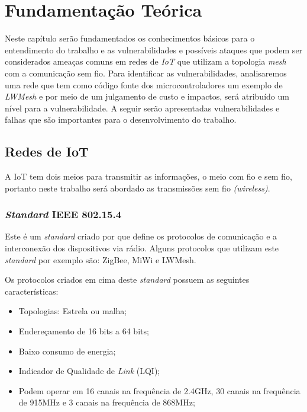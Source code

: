 \chapter{Fundamentação Teórica}
\label{ch:fundamentacao}
\par Neste capítulo serão fundamentados os conhecimentos b\'asicos para o entendimento do trabalho e as vulnerabilidades e possíveis ataques que podem ser considerados ameaças comuns em redes de \emph{IoT} que utilizam a topologia \emph{mesh} com a comunica\c{c}\~ao sem fio. Para identificar as vulnerabilidades, analisaremos uma rede que tem como c\'odigo fonte dos microcontroladores um exemplo de \emph{LWMesh} e por meio de um julgamento de custo e impactos, será atribu\'ido um nível para a vulnerabilidade.
A seguir serão apresentadas vulnerabilidades e falhas que são importantes para o desenvolvimento do trabalho.

\section{Redes de IoT}
\par A IoT tem dois meios para transmitir as informa\c{c}\~oes, o meio com fio e sem fio, portanto neste trabalho ser\'a abordado as transmiss\~oes sem fio \emph{(wireless)}.
\subsection{\emph{Standard} IEEE 802.15.4}
\par Este \'e um \emph{standard} criado por  que define os protocolos de comunica\c{c}\~ao e a interconex\~ao dos dispositivos via r\'adio. Alguns protocolos que utilizam este \emph{standard} por exemplo s\~ao: ZigBee, MiWi e LWMesh.
\par Os protocolos criados em cima deste \emph{standard} possuem as seguintes caracter\'isticas:
\begin{itemize}
    \item Topologias: Estrela ou malha;
    \item Endere\c{c}amento de 16 bits a 64 bits;
    \item Baixo consumo de energia;
    \item Indicador de Qualidade de \emph{Link} (LQI);
    \item Podem operar em 16 canais na frequ\^encia de 2.4GHz, 30 canais na frequ\^encia de 915MHz e 3 canais na frequ\^encia de 868MHz;
\end{itemize}

